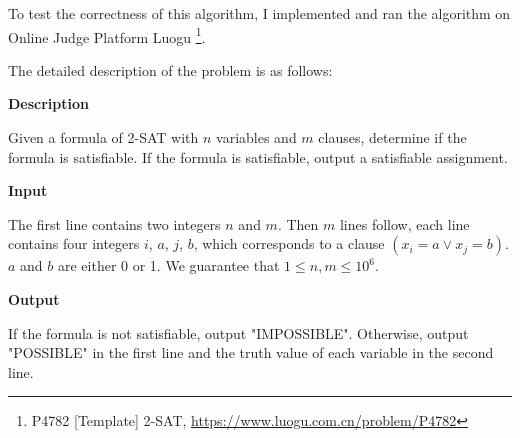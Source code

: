 \documentclass[a4paper,12pt]{article}
\begin{document}
To test the correctness of this algorithm, I implemented and ran the algorithm on Online Judge Platform Luogu \footnote{P4782 [Template] 2-SAT, \url{https://www.luogu.com.cn/problem/P4782}}.

The detailed description of the problem is as follows:

\textbf{Description}

Given a formula of 2-SAT with $n$ variables and $m$ clauses, determine if the formula is satisfiable.
If the formula is satisfiable, output a satisfiable assignment.

\textbf{Input}

The first line contains two integers $n$ and $m$.
Then $m$ lines follow, each line contains four integers $i$, $a$, $j$, $b$, which corresponds to a clause $(x_i = a \vee x_j = b)$.
$a$ and $b$ are either 0 or 1.
We guarantee that $1 \leq n, m \leq 10^6$.

\textbf{Output}

If the formula is not satisfiable, output "IMPOSSIBLE".
Otherwise, output "POSSIBLE" in the first line and the truth value of each variable in the second line.

\vspace{0.5cm}
\end{document}
